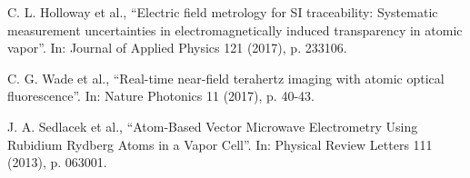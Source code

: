 \documentclass[a4paper]{article}
\begin{document}
\vspace{10pt}
\footnotesize

\begin{enumerate}[start=1, label={[\arabic*]}]
\item C. L. Holloway et al., ``Electric field metrology for SI traceability: Systematic measurement uncertainties in electromagnetically induced transparency in atomic vapor''. In: Journal of Applied Physics 121 (2017), p. 233106.      
\item C. G. Wade et al., ``Real-time near-field terahertz imaging with atomic optical fluorescence''. In: Nature Photonics 11 (2017), p. 40-43.
\item J. A. Sedlacek et al., ``Atom-Based Vector Microwave Electrometry Using Rubidium Rydberg Atoms in a Vapor Cell''. In: Physical Review Letters 111 (2013), p. 063001.
\end{enumerate}
\end{document}
